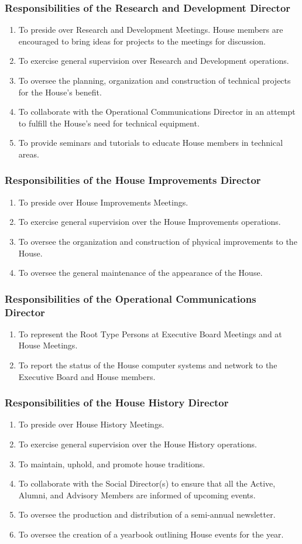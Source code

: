 \documentclass{article}
\newcommand{\asubsection}[1]{\subsubsection{#1} \label{#1}}
\begin{document}
\asubsection{Responsibilities of the Research and Development Director}
\begin{enumerate}
	\item To preside over Research and Development Meetings. House members are encouraged to bring ideas for projects to the meetings for discussion.
	\item To exercise general supervision over Research and Development operations.
	\item To oversee the planning, organization and construction of technical projects for the House's benefit.
	\item To collaborate with the Operational Communications Director in an attempt to fulfill the House's need for technical equipment.
	\item To provide seminars and tutorials to educate House members in technical areas.
\end{enumerate}

\asubsection{Responsibilities of the House Improvements Director}
\begin{enumerate}
	\item To preside over House Improvements Meetings.
	\item To exercise general supervision over the House Improvements operations.
	\item To oversee the organization and construction of physical improvements to the House.
	\item To oversee the general maintenance of the appearance of the House.
\end{enumerate}

\asubsection{Responsibilities of the Operational Communications Director}
\begin{enumerate}
	\item To represent the Root Type Persons at Executive Board Meetings and at House Meetings.
	\item To report the status of the House computer systems and network to the Executive Board and House members.
\end{enumerate}

\asubsection{Responsibilities of the House History Director}
\begin{enumerate}
	\item To preside over House History Meetings.
	\item To exercise general supervision over the House History operations.
	\item To maintain, uphold, and promote house traditions.
	\item To collaborate with the Social Director(s) to ensure that all the Active, Alumni, and Advisory Members are informed of upcoming events.
	\item To oversee the production and distribution of a semi-annual newsletter.
	\item To oversee the creation of a yearbook outlining House events for the year.
\end{enumerate}
\end{document}
